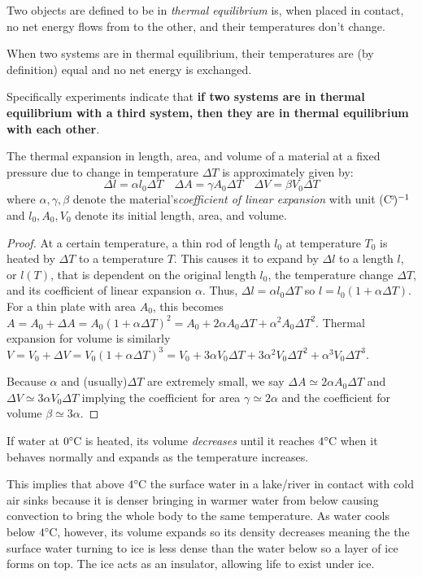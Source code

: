 \begin{definition}
    Two objects are defined to be in \emph{thermal equilibrium} is, when placed in contact, no net energy flows from to the other, and their temperatures don't change.
\end{definition}
\begin{remark}
    When two systems are in thermal equilibrium, their temperatures are (by definition) equal and no net energy is exchanged. 
\end{remark}
\begin{definition}
    Specifically experiments indicate that \textbf{if two systems are in thermal equilibrium with a third system, then they are in thermal equilibrium with each other}.
\end{definition}
\begin{proposition}
    The thermal expansion in length, area, and volume of a material at a fixed pressure due to change in temperature $\Delta T$ is approximately given by:
    \[ \Delta l = \alpha l_0 \Delta T \quad \Delta A = \gamma A_0 \Delta T \quad \Delta V = \beta V_0 \Delta T \] where $\alpha, \gamma, \beta$ denote the material's\emph{coefficient of linear expansion} with unit (C$\operatorname{\!^{\circ}\!})^{-1}$ and $l_0, A_0, V_0$ denote its initial length, area, and volume.
\end{proposition}
\begin{proof}
    At a certain temperature, a thin rod of length $l_0$ at temperature $T_0$ is heated by $\Delta T$ to a temperature $T$. This causes it to expand by $\Delta l$ to a length $l$, or $l(T)$, that is dependent on the original length $l_0$, the temperature change $\Delta T$, and its coefficient of linear expansion $\alpha$. Thus, $\Delta l = \alpha l_0 \Delta T$ so $l = l_0(1+\alpha\Delta T)$. For a thin plate with area $A_0$, this becomes $A = A_0+ \Delta A = A_0(1 + \alpha\Delta T)^2 = A_0 + 2\alpha A_0\Delta T + \alpha^2A_0\Delta T^2$. Thermal expansion for volume is similarly $V = V_0 + \Delta V = V_0 (1 + \alpha \Delta T)^3 = V_0 + 3\alpha V_0\Delta T + 3\alpha^2V_0\Delta T^2 + \alpha^3V_0\Delta T^3$. 

    Because $\alpha$ and (usually)$\Delta T$ are extremely small, we say $\Delta A \simeq 2\alpha A_0\Delta T$ and $\Delta V \simeq 3\alpha V_0\Delta T$ implying the coefficient for area $\gamma \simeq 2\alpha$ and the coefficient for volume $\beta \simeq 3\alpha$.
\end{proof}
\begin{note}
    If water at $0\operatorname{\!^{\circ}\!}$C is heated, its volume \emph{decreases} until it reaches $4\operatorname{\!^{\circ}\!}$C when it behaves normally and expands as the temperature increases.

    This implies that above $4\operatorname{\!^{\circ}\!}$C the surface water in a lake/river in contact with cold air sinks because it is denser bringing in warmer water from below causing convection to bring the whole body to the same temperature. As water cools below $4\operatorname{\!^{\circ}\!}$C, however, its volume expands so its density decreases meaning the the surface water turning to ice is less dense than the water below so a layer of ice forms on top. The ice acts as an insulator, allowing life to exist under ice. 
\end{note}
